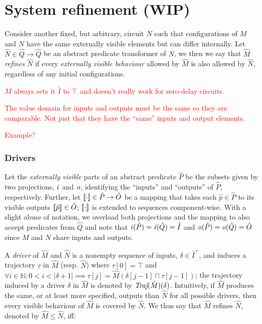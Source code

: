 \section{System refinement (WIP)}

Consider another fixed, but arbitrary, circuit $N$ such that configurations of $M$ and $N$ have the same externally visible elements but can differ internally. Let $\hat N \in \hat Q \rightarrow \hat Q$ be an abstract predicate transformer of $N$, we then we say that $\hat M$ \textit{refines} $\hat N$ if every \textit{externally visible behaviour} allowed by $\hat M$ is also allowed by $\hat N$, regardless of any initial configurations.

\textcolor{red}{$M$ always sets it $\hat I$ to $\top$ and doesn't really work for zero-delay circuits.}

\textcolor{red}{The value domain for inputs and outputs must be the same so they are comparable. Not just that they have the ``same'' inputs and output elements.}

\textcolor{red}{Example?}

\subsubsection{Drivers} Let the \textit{externally visible} parts of an abstract predicate $\hat P$ be the subsets given by two projections, $\mathit{i}$ and $\mathit{o}$, identifying the ``inputs'' and ``outputs'' of $\hat P$, respectively. Further, let $\llbracket\cdot\rrbracket \in \hat P \rightarrow \hat O$ be a mapping that takes each $\hat p \in \hat P$ to its visible outputs $\llbracket\hat p\rrbracket \in \hat O$; $\llbracket\cdot\rrbracket$ is extended to sequences component-wise. With a slight abuse of notation, we overload both projections and the mapping to also accept predicates from $\hat Q$ and note that $\mathit{i}(\hat P) = \mathit{i}(\hat Q) = \hat I$ and $\mathit{o}(\hat P) = \mathit{o}(\hat Q) = \hat O$ since $M$ and $N$ share inputs and outputs.

A \textit{driver} of $\hat M$ and $\hat N$ is a nonempty sequence of inputs, $\delta \in \hat I^{+}$, and induces a trajectory $\tau$ in $\hat M$ (resp. $\hat N$) where $\tau[0] = \top$ and $\forall i \in \mathbb{N} : 0 < i < | \delta + 1 | \implies \tau[j] = \hat M(\delta[j-1] \sqcap \tau[j-1])$; the trajectory induced by a driver $\delta$ in $\hat M$ is denoted by $\textit{Traj}(\hat M)(\delta)$. Intuitively, if $\hat M$ produces the same, or at least more specified, outputs than $\hat N$ for all possible drivers, then every visible behaviour of $\hat M$ is covered by $\hat N$. We thus say that $\hat M$ refines $\hat N$, denoted by $\hat M \leq \hat N$, iff:

